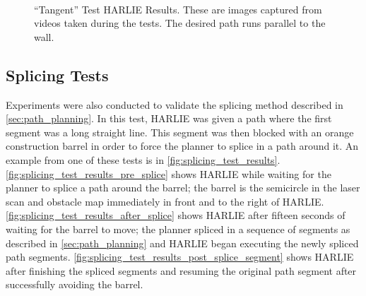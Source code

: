 \begin{figure}
\centering
{}
\\
\caption[``Tangent'' Test HARLIE Results]{``Tangent'' Test HARLIE Results. These are images captured from videos taken during the tests. The desired path runs parallel to the wall.}
\label{fig:tangent_skill_harlie_results}
\end{figure}

\subsection{Splicing Tests}\label{subsec:splicing_tests}

Experiments were also conducted to validate the splicing method described in \autoref{sec:path_planning}. In this test, HARLIE was given a path where the first segment was a long straight line. This segment was then blocked with an orange construction barrel in order to force the planner to splice in a path around it. An example from one of these tests is in \autoref{fig:splicing_test_results}. \autoref{fig:splicing_test_results_pre_splice} shows HARLIE while waiting for the planner to splice a path around the barrel; the barrel is the semicircle in the laser scan and obstacle map immediately in front and to the right of HARLIE. \autoref{fig:splicing_test_results_after_splice} shows HARLIE after fifteen seconds of waiting for the barrel to move; the planner spliced in a sequence of segments as described in \autoref{sec:path_planning} and HARLIE began executing the newly spliced path segments. \autoref{fig:splicing_test_results_post_splice_segment} shows HARLIE after finishing the spliced segments and resuming the original path segment after successfully avoiding the barrel.

